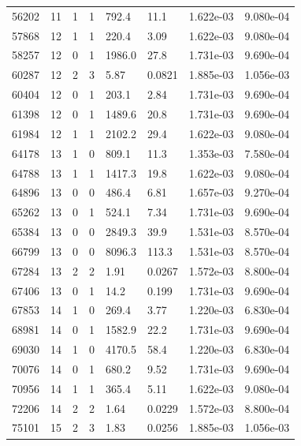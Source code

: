 \documentclass[preview]{standalone}
\begin{document}
{{{\begin{tabular}{L{1.2cm}C{1.2cm} C{0.3cm}C{0.5cm} C{1.4cm}C{1.4cm} C{1.4cm}C{1.4cm}}
  56202  &    11  & 1     &  1 &  792.4  & 11.1  & 1.622e-03 &  9.080e-04   \\ 
  57868  &    12  & 1     &  1 &  220.4  & 3.09  & 1.622e-03 &  9.080e-04   \\ 
  58257  &    12  & 0     &  1 &  1986.0  & 27.8  & 1.731e-03 &  9.690e-04   \\ 
  60287  &    12  & 2     &  3 &  5.87  & 0.0821  & 1.885e-03 &  1.056e-03   \\ 
  60404  &    12  & 0     &  1 &  203.1  & 2.84  & 1.731e-03 &  9.690e-04   \\ 
  61398  &    12  & 0     &  1 &  1489.6  & 20.8  & 1.731e-03 &  9.690e-04   \\ 
  61984  &    12  & 1     &  1 &  2102.2  & 29.4  & 1.622e-03 &  9.080e-04   \\ 
  64178  &    13  & 1     &  0 &  809.1  & 11.3  & 1.353e-03 &  7.580e-04   \\ 
  64788  &    13  & 1     &  1 &  1417.3  & 19.8  & 1.622e-03 &  9.080e-04   \\ 
  64896  &    13  & 0     &  0 &  486.4  & 6.81  & 1.657e-03 &  9.270e-04   \\ 
  65262  &    13  & 0     &  1 &  524.1  & 7.34  & 1.731e-03 &  9.690e-04   \\ 
  65384  &    13  & 0     &  0 &  2849.3  & 39.9  & 1.531e-03 &  8.570e-04   \\ 
  66799  &    13  & 0     &  0 &  8096.3  & 113.3  & 1.531e-03 &  8.570e-04   \\ 
  67284  &    13  & 2     &  2 &  1.91  & 0.0267  & 1.572e-03 &  8.800e-04   \\ 
  67406  &    13  & 0     &  1 &  14.2  & 0.199  & 1.731e-03 &  9.690e-04   \\ 
  67853  &    14  & 1     &  0 &  269.4  & 3.77  & 1.220e-03 &  6.830e-04   \\ 
  68981  &    14  & 0     &  1 &  1582.9  & 22.2  & 1.731e-03 &  9.690e-04   \\ 
  69030  &    14  & 1     &  0 &  4170.5  & 58.4  & 1.220e-03 &  6.830e-04   \\ 
  70076  &    14  & 0     &  1 &  680.2  & 9.52  & 1.731e-03 &  9.690e-04   \\ 
  70956  &    14  & 1     &  1 &  365.4  & 5.11  & 1.622e-03 &  9.080e-04   \\ 
  72206  &    14  & 2     &  2 &  1.64  & 0.0229  & 1.572e-03 &  8.800e-04   \\ 
  75101  &    15  & 2     &  3 &  1.83  & 0.0256  & 1.885e-03 &  1.056e-03   \\ 

\end{tabular}}}}
\end{document}
